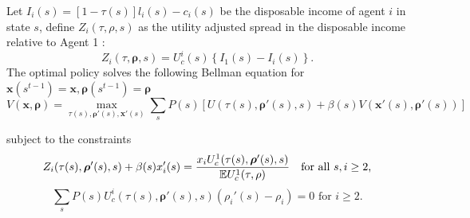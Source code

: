 \documentclass[thmsb,11pt]{article}
\begin{document}
Let $I_i(s)=[1-\tau(s)]l_i(s)-c_i(s)$ be the disposable income of agent $i$ in state $s$, define $Z_i(\tau,\rho,s)$ as the utility adjusted spread in the disposable income relative to Agent 1 :
\[Z_i(\tau,\bm \rho,s)=U^i_c(s)\left\{I_1(s)-I_i(s)\right\}.\]
% 
% 
% 
% 
%  
% 
 The optimal policy  solves the following Bellman equation for $\bm{x}(s^{t-1})=\bm{x},\bm{\rho}(s^{t-1})=\bm{\rho}$
% 
 \begin{equation}
 \label{eq:ss-obj}
 	V(\bm x,\bm \rho) = \max_{\tau(s),\bm \rho'(s),\bm x'(s)}\sum_s P(s)\left[ U(\tau(s),\bm \rho'(s),s) + \beta(s) V(\bm x'(s),\bm \rho'(s))\right] 
 \end{equation}

 
 subject to the constraints
 \begin{equation}
 \label{eq:ss-imp}
 	Z_i(\tau(s),\bm \rho'(s),s) +\beta(s) x'_i(s) = \frac{x_i U^1_c(\tau(s),\bm \rho'(s),s)}{\mathbb{E} U^1_c(\tau,\rho)}\text{   for all  $s,i \geq 2$,}\\  
 \end{equation}
\begin{equation}
\label{eq:bondcondtion} 
 	\sum_s P(s)U^i_c(\tau(s),\bm \rho'(s),s)(\rho_i'(s)-\rho_i) = 0 \text{  for $i \geq 2.$} 
\end{equation}
 
\end{document}
